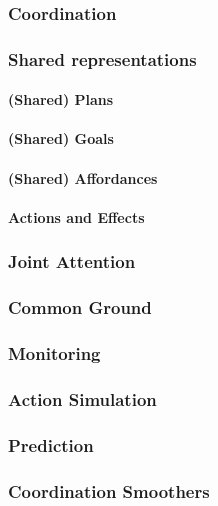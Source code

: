 \documentclass[a4paper,11pt,twoside]{StyleThese}
\begin{document}
\subsubsection{Coordination}

\subsubsection{Shared representations}

\paragraph{(Shared) Plans}

\paragraph{(Shared) Goals}

\paragraph{(Shared) Affordances}

\paragraph{Actions and Effects}

\subsubsection{Joint Attention}

\subsubsection{Common Ground}

\subsubsection{Monitoring}

\subsubsection{Action Simulation}

\subsubsection{Prediction}

\subsubsection{Coordination Smoothers}
\end{document}

